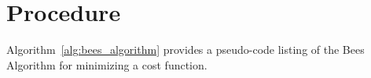 \documentclass[a4paper, 11pt]{article}
\begin{document}
\section{Procedure}
\label{sec:procedure}
Algorithm~\ref{alg:bees_algorithm} provides a pseudo-code listing of the Bees Algorithm for minimizing a cost function. 
\end{document}
